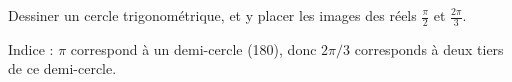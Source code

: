
\begin{exercice}\label{exosmath-0373}

    Dessiner un cercle trigonométrique, et y placer les images des réels \( \frac{ \pi }{2}\) et \( \frac{ 2\pi }{ 3 }\).

    Indice : \( \pi\) correspond à un demi-cercle (\unit{180}{\degree}), donc \( 2\pi/3\) corresponds à deux tiers de ce demi-cercle.

\end{exercice}
